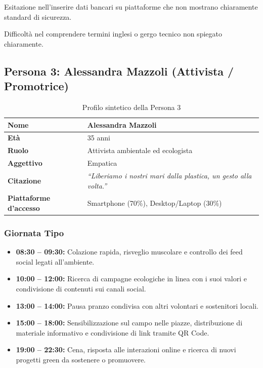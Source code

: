 \documentclass[11pt,a4paper]{article}
\begin{document}
Esitazione nell'inserire dati bancari su piattaforme che non mostrano chiaramente standard di sicurezza.

Difficoltà nel comprendere termini inglesi o gergo tecnico non spiegato chiaramente.


\subsection{Persona 3: Alessandra Mazzoli (Attivista / Promotrice)}
\label{subsec:persona3}

\begin{table}[h!]
\centering
\small
\begin{tabular}{|p{3.5cm}|p{11.5cm}|}
\hline
\textbf{Nome} & Alessandra Mazzoli \\ \hline
\textbf{Età} & 35 anni \\ \hline
\textbf{Ruolo} & Attivista ambientale ed ecologista \\ \hline
\textbf{Aggettivo} & Empatica \\ \hline
\textbf{Citazione} & \textit{``Liberiamo i nostri mari dalla plastica, un gesto alla volta.''} \\ \hline
\textbf{Piattaforme d'accesso} & Smartphone (70\%), Desktop/Laptop (30\%) \\ \hline
\end{tabular}
\caption{Profilo sintetico della Persona 3}
\label{tab:persona3}
\end{table}

\subsubsection{Giornata Tipo}
\begin{itemize}
    \item \textbf{08:30 -- 09:30:} Colazione rapida, risveglio muscolare e controllo dei feed social legati all'ambiente.
    \item \textbf{10:00 -- 12:00:} Ricerca di campagne ecologiche in linea con i suoi valori e condivisione di contenuti sui canali social.
    \item \textbf{13:00 -- 14:00:} Pausa pranzo condivisa con altri volontari e sostenitori locali.
    \item \textbf{15:00 -- 18:00:} Sensibilizzazione sul campo nelle piazze, distribuzione di materiale informativo e condivisione di link tramite QR Code.
    \item \textbf{19:00 -- 22:30:} Cena, risposta alle interazioni online e ricerca di nuovi progetti green da sostenere o promuovere.
\end{itemize}
\end{document}
